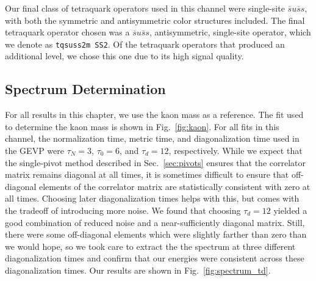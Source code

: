 Our final class of tetraquark operators used in this channel were single-site $\overline s u \overline s s$, with both the symmetric and antisymmetric color structures included. The final tetraquark operator chosen was a $\overline s u \overline s s$, antisymmetric, single-site operator, which we denote as \verb+tqsuss2m SS2+. Of the tetraquark operators that produced an additional level, we chose this one due to its high signal quality.
\subsection{Spectrum Determination}
For all results in this chapter, we use the kaon mass as a reference. The fit used to determine the kaon mass is shown in Fig.~\ref{fig:kaon}. For all fits in this channel, the normalization time, metric time, and diagonalization time used in the GEVP were $\tau_N=3$, $\tau_0=6$, and $\tau_d=12$, respectively. While we expect that the single-pivot method described in Sec.~\ref{sec:pivots} ensures that the correlator matrix remains diagonal at all times, it is sometimes difficult to ensure that off-diagonal elements of the correlator matrix are statistically consistent with zero at all times. Choosing later diagonalization times helps with this, but comes with the tradeoff of introducing more noise. We found that choosing $\tau_d=12$ yielded a good combination of reduced noise and a near-sufficiently diagonal matrix. Still, there were some off-diagonal elements which were slightly farther than zero than we would hope, so we took care to extract the the spectrum at three different diagonalization times and confirm that our energies were consistent across these diagonalization times. Our results are shown in Fig.~\ref{fig:spectrum_td}.

